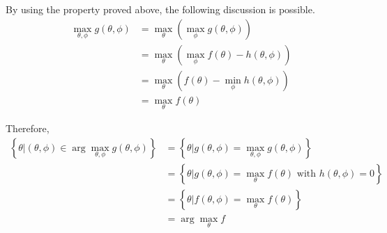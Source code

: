\documentclass[10pt]{article}
\begin{document}
By using the property proved above, the following discussion is possible. 
\begin{align*}
    \max_{\theta,\phi} g(\theta, \phi) &= \max_{\theta}(\max_{\phi}g(\theta,\phi)) \\
    &= \max_\theta(\max_\phi f(\theta) - h(\theta, \phi))\\
    &= \max_\theta(f(\theta) - \min_\phi h(\theta, \phi)) \\
    &= \max_\theta f(\theta)
\end{align*}

Therefore, 
\begin{align*}
    \left\{\theta \bigg| (\theta, \phi) \in \arg\max_{\theta, \phi}g(\theta, \phi)\right\} &= \left\{\theta \bigg| g(\theta, \phi) = \max_{\theta, \phi}g(\theta, \phi)\right\} \\
    &= \left\{\theta \bigg| g(\theta,\phi) = \max_{\theta}f(\theta) \text{ with } h(\theta, \phi) = 0\right\} \\
    &= \left\{\theta \bigg| f(\theta, \phi) = \max_{\theta}f(\theta)\right\} \\
    &= \arg\max_{\theta}f
\end{align*}
\end{document}
